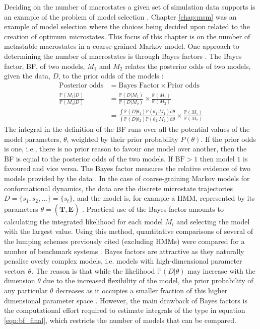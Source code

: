 Deciding on the number of macrostates a given set of simulation data supports is an example of the problem of model selection \cite[chapter 6]{friedman2001elements}\cite{claeskens_hjort_2008}. Chapter \ref{chap:msm} was an example of model selection where the choices being decided upon related to the creation of optimum microstates.  This focus of this chapter is on the number of metastable macrostates in a coarse-grained Markov model. One approach to determining the number of macrostates is through Bayes factors \cite{kassBayesFactors1995}. The Bayes factor, BF, of two models, $M_{1}$ and $M_{2}$ relates the posterior odds of two models, given the data, $D$, to the prior odds of the models \cite{kassBayesFactors1995}:
\begin{align}
\text{Posterior odds} & = \text{Bayes Factor} \times \text{Prior odds} \\
\frac{ \mathbb{P}(M_1|D) }{ \mathbb{P}(M_2|D) } & = \frac{ \mathbb{P}(D|M_1) }{ \mathbb{P}(D|M_2) } \times \frac{ \mathbb{P}(M_1) }{ \mathbb{P}(M_2) }\\
& = \frac{\int \mathbb{P}\left( D | \theta_{1} \right)\mathbb{P}(\theta_{1}|M_{1}) \mathrm{d}\theta}{\int \mathbb{P}\left( D | \theta_{2} \right)\mathbb{P}(\theta_{2}|M_{2}) \mathrm{d}\theta} \times \frac{\mathbb{P}(M_1)}{\mathbb{P}(M_2)}\label{eqn:bf_final}
\end{align}
The integral in the definition of the BF runs over all the potential values of the model parameters, $\theta$, weighted by their prior probability $P(\theta)$. If the prior odds is one, i.e., there is no prior reason to favour one model over another, then the BF is equal to the posterior odds of the two models. If $\textrm{BF} > 1$ then model $1$ is favoured and vice versa. The Bayes factor measures the relative evidence of two models provided by the data \cite{kassBayesFactors1995}. In the case of coarse-graining Markov models for conformational dynamics, the data are the discrete microstate trajectories $D = \{s_1, s_2, ...\}= \{s_t\}$, and the model is, for example a HMM, represented by its parameters $\theta = (\tilde{\mathbf{T}}, \mathbf{E})$ \cite{bacalladoBayesianComparisonMarkov2009a}. Practical use of the Bayes factor amounts to calculating the integrated likelihood  for each model $M_i$ and selecting the model with the largest value. Using this method, quantitative comparisons of several of the lumping schemes previously cited  (excluding HMMs) were  compared for a number of benchmark systems \cite{bowmanQuantitativeComparisonAlternative2013}. Bayes factors are attractive as they naturally penalise overly complex models, i.e. models with high-dimensional parameter vectors $\theta$. The reason is that while the likelihood $\mathbb{P}(D|\theta)$ may increase with the dimension $\theta$ due to the increased flexibility of the model, the prior probability of any particular $\theta$ decreases as it occupies a smaller fraction of this higher dimensional parameter space \cite{kassBayesFactors1995,mackay2003information}. However, the main drawback of Bayes factors is the computational effort required to estimate integrals of the type in equation \ref{eqn:bf_final}, which restricts the number of models that can be compared. 


